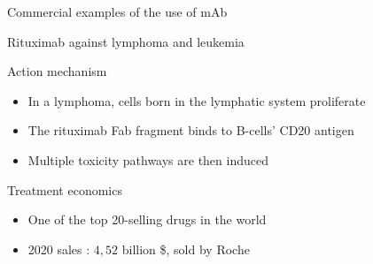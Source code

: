 \begin{frame}{Commercial examples of the use of mAb}
    \begin{block}{Rituximab against lymphoma and leukemia}
        \begin{exampleblock}{Action mechanism}
            \begin{itemize}
                \item In a lymphoma, cells born in the lymphatic system proliferate
                \item The rituximab Fab fragment binds to B-cells' CD20 antigen
                \item Multiple toxicity pathways are then induced
            \end{itemize}
        \end{exampleblock}
        
        \begin{exampleblock}{Treatment economics}
            \begin{itemize}
                \item One of the top 20-selling drugs in the world
                \item 2020 sales : $4,52$ billion \$, sold by Roche
            \end{itemize}
        \end{exampleblock}
    \end{block}
\end{frame}

